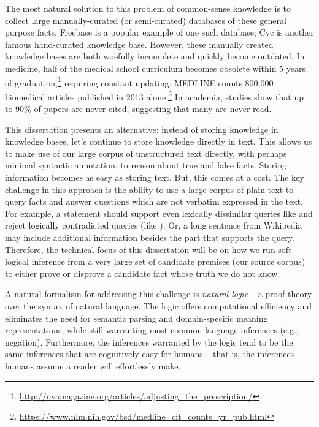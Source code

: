 The most natural solution to this problem of common-sense knowledge is to collect large 
  manually-curated (or semi-curated) databases of these general purpose facts.
Freebase \cite{key:2008bollacker-freebase} is a popular example of one
  such database; Cyc \cite{key:1995lenat-cyc} is another famous hand-curated
  knowledge base.
However, these manually created knowledge bases are both woefully incomplete 
  and quickly become outdated.
In medicine, half of the medical school curriculum becomes obsolete within 5 
  years of graduation,\footnote{
    \url{http://uvamagazine.org/articles/adjusting\_the\_prescription/}
  }
  requiring constant updating.
  MEDLINE counts 800,000 biomedical articles published in 2013 alone.\footnote{
    \url{https://www.nlm.nih.gov/bsd/medline\_cit\_counts\_yr\_pub.html}
  }
In academia, studies show that up to 90\% of papers are never 
  cited, suggesting that many are never read.

This dissertation presents an alternative:
  instead of storing knowledge in knowledge bases, let's continue to store knowledge
  directly in text.
This allows us to make use of our large corpus of unstructured text directly, with
  perhaps minimal syntactic annotation, to reason about true and false facts.
Storing information becomes as easy as storing text.
But, this comes at a cost.
The key challenge in this approach is the ability to use a large 
  corpus of plain text to query facts and answer questions which are not verbatim 
  expressed in the text.
For example, a statement  should support even lexically 
  dissimilar queries like  and reject logically 
  contradicted queries (like ).
Or, a long sentence from Wikipedia may include additional information besides 
  the part that supports the query.
Therefore, the technical focus of this dissertation will be on how we run soft logical
  inference from a very large set of candidate premises (our source corpus) to either
  prove or disprove a candidate fact whose truth we do not know.

A natural formalism for addressing this challenge is \textit{natural logic} -- a proof 
  theory over the syntax of natural language.
The logic offers computational efficiency and eliminates the need for semantic 
  parsing and domain-specific meaning representations, while still warranting most 
  common language inferences (e.g., negation). 
Furthermore, the inferences warranted by the logic tend to be 
  the same inferences that are cognitively easy for humans -- that is, 
  the inferences humans assume a reader will effortlessly make.

